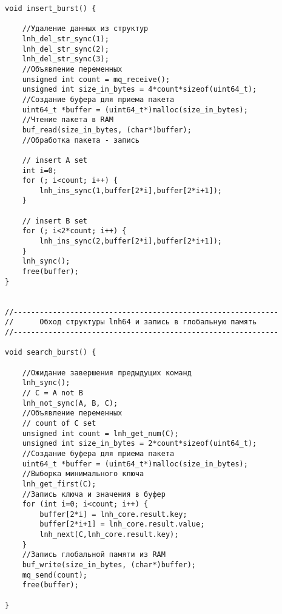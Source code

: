 \begin{lstlisting}[label=lst:swkernel,caption=Измененный код sw\_kernel под индивидульное задание]
void insert_burst() {
	
	//Удаление данных из структур
	lnh_del_str_sync(1);
	lnh_del_str_sync(2);
	lnh_del_str_sync(3);
	//Объявление переменных
	unsigned int count = mq_receive();
	unsigned int size_in_bytes = 4*count*sizeof(uint64_t);
	//Создание буфера для приема пакета
	uint64_t *buffer = (uint64_t*)malloc(size_in_bytes);
	//Чтение пакета в RAM
	buf_read(size_in_bytes, (char*)buffer);
	//Обработка пакета - запись
	
	// insert A set
	int i=0;
	for (; i<count; i++) {
		lnh_ins_sync(1,buffer[2*i],buffer[2*i+1]);
	}
	
	// insert B set
	for (; i<2*count; i++) {
		lnh_ins_sync(2,buffer[2*i],buffer[2*i+1]);
	}
	lnh_sync();
	free(buffer);
}


//-------------------------------------------------------------
//      Обход структуры lnh64 и запись в глобальную память 
//-------------------------------------------------------------

void search_burst() {
	
	//Ожидание завершения предыдущих команд
	lnh_sync();
	// C = A not B
	lnh_not_sync(A, B, C);
	//Объявление переменных
	// count of C set
	unsigned int count = lnh_get_num(C);
	unsigned int size_in_bytes = 2*count*sizeof(uint64_t);
	//Создание буфера для приема пакета
	uint64_t *buffer = (uint64_t*)malloc(size_in_bytes);
	//Выборка минимального ключа
	lnh_get_first(C);
	//Запись ключа и значения в буфер
	for (int i=0; i<count; i++) {
		buffer[2*i] = lnh_core.result.key;
		buffer[2*i+1] = lnh_core.result.value;
		lnh_next(C,lnh_core.result.key);
	}
	//Запись глобальной памяти из RAM
	buf_write(size_in_bytes, (char*)buffer);
	mq_send(count);
	free(buffer);
	
}
\end{lstlisting}
